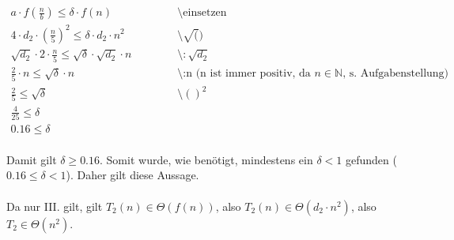 \documentclass{article}
\begin{document}
\begin{enumerate}
   	    \[
   	        \begin{array}{lll}
   	            a \cdot f(\frac{n}{b}) \leq \delta \cdot f(n)~~~~~~~~~~~~~~~~~~~~~~~&\text{\textbackslash einsetzen}\\
   	            4 \cdot d_2\cdot (\frac{n}{5})^2 \leq \delta \cdot d_2\cdot n^2 &\text{\textbackslash $\sqrt()$}\\
   	            \sqrt{d_2}\cdot 2 \cdot \frac{n}{5} \leq \sqrt{\delta}\cdot \sqrt{d_2} \cdot n & \text{\textbackslash $:\sqrt{d_2}$}\\
   	            \frac{2}{5}\cdot n \leq \sqrt{\delta} \cdot n &\text{\textbackslash :n    (n ist immer positiv, da $n \in \mathbb{N}$, s. Aufgabenstellung)}\\
   	            \frac{2}{5} \leq \sqrt{\delta} &\text{\textbackslash $()^2$}\\
   	            \frac{4}{25} \leq \delta\\
   	            0.16 \leq \delta
   	        \end{array}
   	    \]
   	    \\
   	    Damit gilt $\delta \geq 0.16$. Somit wurde, wie benötigt, mindestens ein $\delta < 1$ gefunden ($0.16 \leq \delta < 1$). Daher gilt diese Aussage.
   	    \\\\
   	    Da nur III. gilt, gilt $T_2(n) \in \Theta (f(n))$, also $T_2(n) \in \Theta (d_2\cdot n^2)$, also $T_2 \in \Theta (n^2)$.
   	\end{enumerate}
   	
\end{document}
